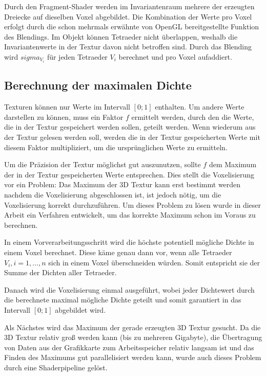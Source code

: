 \documentclass[a4paper,fontsize=12pt,toc=bib,parskip=half,ngerman]{scrartcl}
\begin{document}
Durch den Fragment-Shader werden im Invariantenraum mehrere der erzeugten Dreiecke auf dieselben Voxel abgebildet. Die Kombination der Werte pro Voxel erfolgt durch die schon mehrmals erw\"ahnte von OpenGL bereitgestellte Funktion des Blendings. Im Objekt k\"onnen Tetraeder nicht \"uberlappen, weshalb die Invariantenwerte in der Textur davon nicht betroffen sind. Durch das Blending wird $sigma_{V_i}$ f\"ur jeden Tetraeder $V_i$ berechnet und pro Voxel aufaddiert.

\subsection{Berechnung der maximalen Dichte}
\label{sec:Maximum}
Texturen k\"onnen nur Werte im Intervall $[0;1]$ enthalten. Um andere Werte darstellen zu k\"onnen, muss ein Faktor $f$ ermittelt werden, durch den die Werte, die in der Textur gespeichert werden sollen, geteilt werden. Wenn wiederum aus der Textur gelesen werden soll, werden die in der Textur gespeicherten Werte mit diesem Faktor multipliziert, um die urspr\"unglichen Werte zu ermitteln.

Um die Pr\"azision der Textur m\"oglichst gut auszunutzen, sollte $f$ dem Maximum der in der Textur gespeicherten Werte entsprechen. Dies stellt die Voxelisierung vor ein Problem: Das Maximum der 3D Textur kann erst bestimmt werden nachdem die Voxelisierung abgeschlossen ist, ist jedoch n\"otig, um die Voxelisierung korrekt durchzuf\"uhren. Um dieses Problem zu l\"osen wurde in dieser Arbeit ein Verfahren entwickelt, um das korrekte Maximum schon im Voraus zu berechnen.

In einem Vorverarbeitungsschritt wird die h\"ochste potentiell m\"ogliche Dichte in einem Voxel berechnet. Diese k\"ame genau dann vor, wenn alle Tetraeder $V_i, i=1,\dots,n$ sich in einem Voxel \"uberschneiden w\"urden. Somit entspricht sie der Summe der Dichten aller Tetraeder. 

Danach wird die Voxelisierung einmal ausgef\"uhrt, wobei jeder Dichtewert durch die berechnete maximal m\"ogliche Dichte geteilt und somit garantiert in das Intervall $[0;1]$ abgebildet wird. 

Als N\"achstes wird das Maximum der gerade erzeugten 3D Textur gesucht. Da die 3D Textur relativ gro{\ss} werden kann (bis zu mehreren Gigabyte), die \"Ubertragung von Daten aus der Grafikkarte zum Arbeitsspeicher relativ langsam ist und das Finden des Maximums gut parallelisiert werden kann, wurde auch dieses Problem durch eine Shaderpipeline gel\"ost. 
\end{document}
